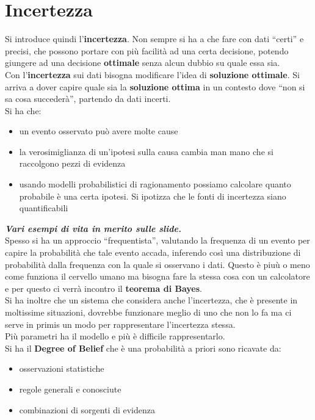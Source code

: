 \documentclass[a4paper,12pt, oneside]{book}
\begin{document}
\section{Incertezza}
Si introduce quindi l'\textbf{incertezza}. Non sempre si ha a che fare con dati
``certi'' e precisi, che possono portare con più facilità ad una certa
decisione, potendo giungere ad una decisione \textbf{ottimale} senza alcun
dubbio su quale essa sia.\\
Con l'\textbf{incertezza} sui dati bisogna modificare l'idea di
\textbf{soluzione ottimale}. Si arriva a dover capire quale sia la
\textbf{soluzione ottima} in un contesto dove ``non si sa cosa succederà'',
partendo da dati incerti.\\
Si ha che:
\begin{itemize}
  \item un evento osservato può avere molte cause
  \item la verosimiglianza di un'ipotesi sulla causa cambia man mano che si
  raccolgono pezzi di evidenza
  \item usando modelli probabilistici di ragionamento possiamo calcolare quanto
  probabile è una certa ipotesi. Si ipotizza che le fonti di incertezza siano
  quantificabili
\end{itemize}
\textbf{\textit{Vari esempi di vita in merito sulle slide.}}\\
Spesso si ha un approccio ``frequentista'', valutando la frequenza di un evento
per capire la probabilità che tale evento accada, inferendo così una
distribuzione di probabilità dalla frequenza con la quale si osservano i
dati. Questo è piuù o meno come funziona il cervello umano ma bisogna fare la
stessa cosa con un calcolatore e per questo ci verrà incontro il \textbf{teorema
  di Bayes}.\\
Si ha inoltre che un sistema che considera anche l'incertezza, che è presente in
moltissime situazioni, dovrebbe funzionare meglio di uno che non lo fa ma ci
serve in primis un modo per rappresentare l'incertezza stessa. \\
Più parametri ha il modello e più è difficile rappresentarlo.\\
Si ha il \textbf{Degree of Belief} che è una probabilità a priori sono ricavate
da:
\begin{itemize}
  \item osservazioni statistiche
  \item regole generali e conosciute
  \item combinazioni di sorgenti di evidenza
\end{itemize}
\end{document}
